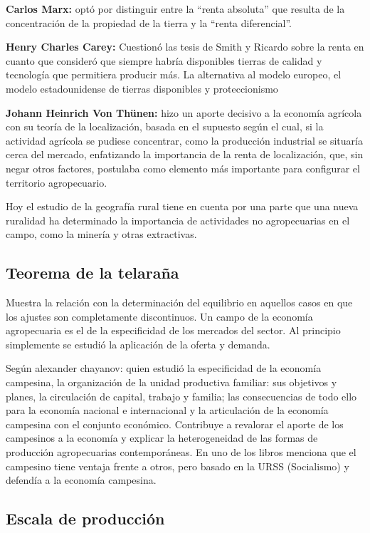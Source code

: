 \documentclass[
  a4paper,
]{article}
\begin{document}
\textbf{Carlos Marx:} optó por distinguir entre la ``renta absoluta''
que resulta de la concentración de la propiedad de la tierra y la
``renta diferencial''.

\textbf{Henry Charles Carey:} Cuestionó las tesis de Smith y Ricardo
sobre la renta en cuanto que consideró que siempre habría disponibles
tierras de calidad y tecnología que permitiera producir más. La
alternativa al modelo europeo, el modelo estadounidense de tierras
disponibles y proteccionismo

\textbf{Johann Heinrich Von Thünen:} hizo un aporte decisivo a la
economía agrícola con su teoría de la localización, basada en el
supuesto según el cual, si la actividad agrícola se pudiese concentrar,
como la producción industrial se situaría cerca del mercado, enfatizando
la importancia de la renta de localización, que, sin negar otros
factores, postulaba como elemento más importante para configurar el
territorio agropecuario.

Hoy el estudio de la geografía rural tiene en cuenta por una parte que
una nueva ruralidad ha determinado la importancia de actividades no
agropecuarias en el campo, como la minería y otras extractivas.

\hypertarget{teorema-de-la-telarauxf1a}{%
\subsection{Teorema de la telaraña}\label{teorema-de-la-telarauxf1a}}

Muestra la relación con la determinación del equilibrio en aquellos
casos en que los ajustes son completamente discontinuos. Un campo de la
economía agropecuaria es el de la especificidad de los mercados del
sector. Al principio simplemente se estudió la aplicación de la oferta y
demanda.

Según alexander chayanov: quien estudió la especificidad de la economía
campesina, la organización de la unidad productiva familiar: sus
objetivos y planes, la circulación de capital, trabajo y familia; las
consecuencias de todo ello para la economía nacional e internacional y
la articulación de la economía campesina con el conjunto económico.
Contribuye a revalorar el aporte de los campesinos a la economía y
explicar la heterogeneidad de las formas de producción agropecuarias
contemporáneas. En uno de los libros menciona que el campesino tiene
ventaja frente a otros, pero basado en la URSS (Socialismo) y defendía a
la economía campesina.

\hypertarget{escala-de-producciuxf3n}{%
\subsection{Escala de producción}\label{escala-de-producciuxf3n}}
\end{document}
